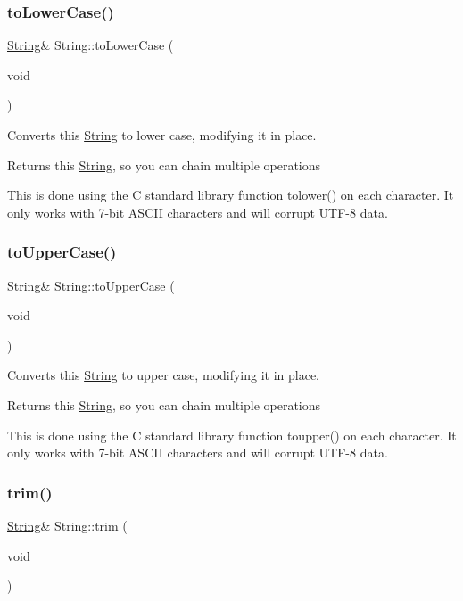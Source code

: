 \subsubsection{\texorpdfstring{to\+Lower\+Case()}{toLowerCase()}}
{\footnotesize\ttfamily \hyperlink{class_string}{String}\& String\+::to\+Lower\+Case (\begin{DoxyParamCaption}\item[{void}]{ }\end{DoxyParamCaption})}



Converts this \hyperlink{class_string}{String} to lower case, modifying it in place. 

\begin{DoxyReturn}{Returns}
this \hyperlink{class_string}{String}, so you can chain multiple operations
\end{DoxyReturn}
This is done using the C standard library function tolower() on each character. It only works with 7-\/bit A\+S\+C\+II characters and will corrupt U\+T\+F-\/8 data. \mbox{\label{class_string_ad911fa09bbf609765ed4a0c8eecbe96f}} 
\subsubsection{\texorpdfstring{to\+Upper\+Case()}{toUpperCase()}}
{\footnotesize\ttfamily \hyperlink{class_string}{String}\& String\+::to\+Upper\+Case (\begin{DoxyParamCaption}\item[{void}]{ }\end{DoxyParamCaption})}



Converts this \hyperlink{class_string}{String} to upper case, modifying it in place. 

\begin{DoxyReturn}{Returns}
this \hyperlink{class_string}{String}, so you can chain multiple operations
\end{DoxyReturn}
This is done using the C standard library function toupper() on each character. It only works with 7-\/bit A\+S\+C\+II characters and will corrupt U\+T\+F-\/8 data. \mbox{\label{class_string_ab479206db8365accc3ee40108798f8dc}} 
\subsubsection{\texorpdfstring{trim()}{trim()}}
{\footnotesize\ttfamily \hyperlink{class_string}{String}\& String\+::trim (\begin{DoxyParamCaption}\item[{void}]{ }\end{DoxyParamCaption})}



